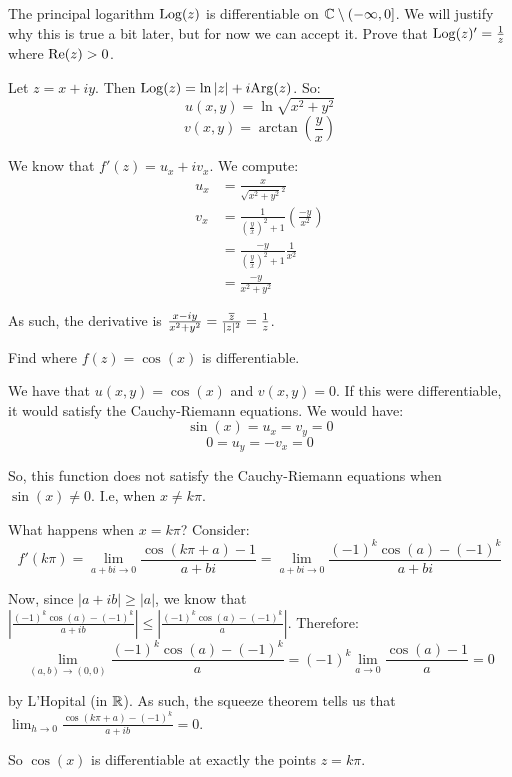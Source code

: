 \begin{ex}{}{} The principal logarithm $\mathrm{Log}(z)$ is differentiable on $\mathbb{C}\setminus (-\infty,0]$. We will justify why this is true a bit later, but for now we can accept it. Prove that $\mathrm{Log}(z)' = \frac{1}{z}$ where $\operatorname{Re}(z) > 0$.

Let $z = x + iy$. Then $\mathrm{Log}(z) = \ln|z| + i\mathrm{Arg}(z)$. So:
$$u(x,y) = \ln \sqrt{x^2+ y^2}$$
$$v(x,y) = \arctan\left(\frac{y}{x}\right)$$

We know that $f'(z) = u_x + iv_x$. We compute:
\begin{align*}u_x &= \frac{x}{\sqrt{x^2 + y^2}^2}\\
v_x &= \frac{1}{\left(\frac{y}{x}\right)^2 + 1}\left(\frac{-y}{x^2}\right)\\
&= \frac{-y}{\left(\frac{y}{x}\right)^2 + 1}\frac{1}{x^2}\\
&= \frac{-y}{x^2 + y^2}
\end{align*}

As such, the derivative is $\frac{x - iy}{x^2 + y^2} = \frac{\overline{z}}{|z|^2} = \frac{1}{z}$.
\end{ex}

\begin{ex}{}{} Find where $f(z) = \cos(x)$ is differentiable.

We have that $u(x,y) = \cos(x)$ and $v(x,y) = 0$. If this were differentiable, it would satisfy the Cauchy-Riemann equations. We would have:
$$\sin(x) = u_x = v_y = 0$$
$$0 = u_y = -v_x = 0$$

So, this function does not satisfy the Cauchy-Riemann equations when $\sin(x) \ne 0$. I.e, when $x\ne k\pi$.

What happens when $x = k\pi$? Consider:
$$f'(k\pi) = \lim_{a+bi\rightarrow 0} \frac{\cos(k\pi + a) - 1}{a+bi} = \lim_{a+bi\rightarrow 0} \frac{(-1)^k\cos(a) - (-1)^k}{a+bi} $$

Now, since $|a+ib| \ge |a|$, we know that $\left|\frac{(-1)^k\cos(a) - (-1)^k}{a+ib}\right| \le \left|\frac{(-1)^k\cos(a) - (-1)^k}{a}\right|$. Therefore:
$$\lim_{(a,b)\rightarrow (0,0)} \frac{(-1)^k\cos(a) - (-1)^k}{a} = (-1)^k \lim_{a\rightarrow 0} \frac{\cos(a) - 1}{a} = 0$$

\noin by L'Hopital (in $\mathbb{R}$). As such, the squeeze theorem tells us that $\lim_{h\rightarrow 0} \frac{\cos(k\pi + a) - (-1)^k}{a + ib} = 0$.

So $\cos(x)$ is differentiable at exactly the points $z = k\pi$.

\end{ex}


